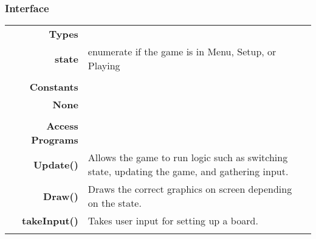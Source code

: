\documentclass[10pt]{article}
\begin{document}
    \subsubsection{Interface}
        \begin{tabularx}{\linewidth}{@{} >{\bfseries}r Xp{5cm} }
            Types           & \begin{tabular}[t]{@{} l p{8cm}} 
                                     & \\
                                    state & enumerate if the game is in Menu, Setup, or Playing \\
                              \end{tabular} \\
                              
            Constants       & \begin{tabular}[t]{@{} l p{8cm}} 
                                     & \\
                                    None & \\
                              \end{tabular} \\

            Access Programs & \begin{tabular}[t]{@{} l p{8cm}}
                                     & \\
                                    Update() & Allows the game to run logic such as switching state, updating the game, and gathering input. \\
                                    Draw() & Draws the correct graphics on screen depending on the state. \\ 
                                    takeInput() & Takes user input for setting up a board. \\
                              \end{tabular}
        \end{tabularx}
        
\end{document}
